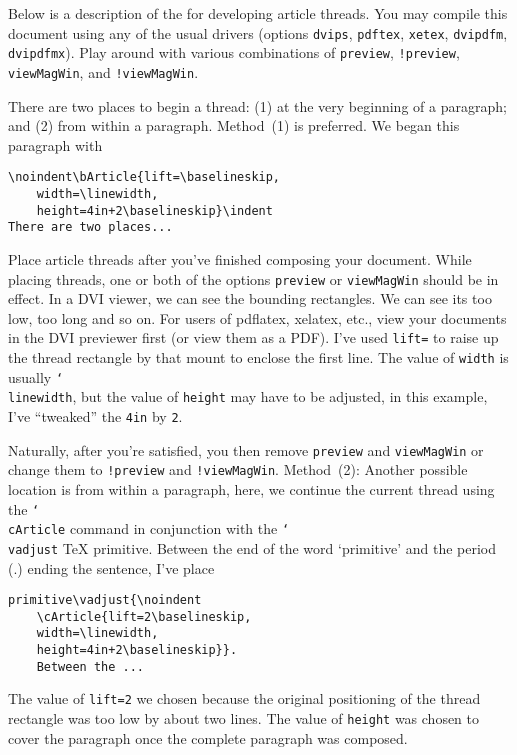 \documentclass{article}
\providecommand{\cs}[1]{\texttt{\char`\\#1}}
\begin{document}


\noindent
Below is a description of the 
for developing article threads. You
may compile this document using any of the usual drivers (options
\texttt{dvips}, \texttt{pdftex}, \texttt{xetex}, \texttt{dvipdfm}, \texttt{dvipdfmx}).
Play around with various combinations of \texttt{preview}, \texttt{!preview},
\texttt{viewMagWin}, and \texttt{!viewMagWin}.


\begin{multicols}{2}
\noindent{}\indent
There are two places to begin a thread: (1) at the very beginning of a paragraph;
and (2) from within a paragraph. Method~(1) is preferred. We began this paragraph
with
\begin{Verbatim}[xleftmargin=\parindent,fontsize=\small]
\noindent\bArticle{lift=\baselineskip,
    width=\linewidth,
    height=4in+2\baselineskip}\indent
There are two places...
\end{Verbatim}
Place article threads after you've finished composing your document. While
placing threads, one or both of the  options \texttt{preview} or
\texttt{viewMagWin} should be in effect. In a \textsf{DVI} viewer, we can see
the bounding rectangles. We can see its too low, too long and so on. For
users of \textsf{pdflatex}, \textsf{xelatex}, etc., view your documents in
the \textsf{DVI} previewer first (or view them as a \textsf{PDF}). I've used
\texttt{lift=\string\baselineskip} to raise up the thread rectangle by that
mount to enclose the first line. The value of \texttt{width} is usually
\cs{linewidth}, but the value of \texttt{height} may have to be adjusted, in
this example, I've ``tweaked'' the \texttt{4in} by
\texttt{2\string\baselineskip}.

Naturally, after you're satisfied, you then remove \texttt{preview} and
\texttt{viewMagWin} or change them to \texttt{!preview} and
\texttt{!viewMagWin}. Method~(2): Another possible location is from within a
paragraph, here, we continue the current thread using the \cs{cArticle}
command in conjunction with the \cs{vadjust} {\TeX}
primitive.
Between the end of the word `primitive' and the period (.) ending the
sentence, I've place
\begin{Verbatim}[xleftmargin=\parindent,fontsize=\small]
primitive\vadjust{\noindent
    \cArticle{lift=2\baselineskip,
    width=\linewidth,
    height=4in+2\baselineskip}}.
    Between the ...
\end{Verbatim}
The value of \texttt{lift=2\string\baselineskip} we chosen because the
original positioning of the thread rectangle was too low by about two lines.
The value of \texttt{height} was chosen to cover the paragraph once the
complete paragraph was composed.


\end{multicols}
\end{document}

